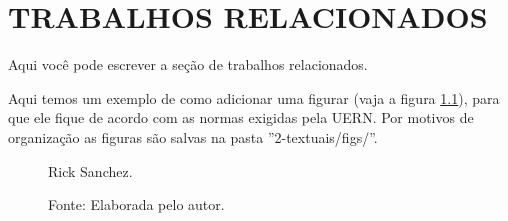 \chapter{TRABALHOS RELACIONADOS}
\label{Relacionados}

Aqui você pode escrever a seção de trabalhos relacionados.

Aqui temos um exemplo de como adicionar uma figurar (vaja a figura \ref{fig_Exemplo}), para que ele fique de acordo com as normas exigidas pela UERN. Por motivos de organização as figuras são salvas na pasta ''2-textuais/figs/''.


\begin{figure}[!ht]
    \centering
    \begin{minipage}{11cm}
    \centering
    \caption{Rick Sanchez.}
    \label{fig_Exemplo}
    \caption*{Fonte: Elaborada pelo autor.}
    \end{minipage}
\end{figure}




